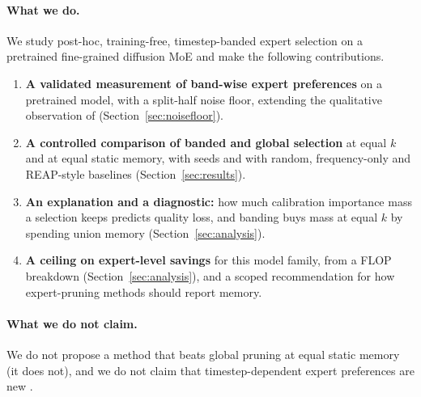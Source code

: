 \paragraph{What we do.}
We study post-hoc, training-free, timestep-banded expert selection on a pretrained fine-grained diffusion MoE and make the following contributions.
\begin{enumerate}
\item \textbf{A validated measurement of band-wise expert preferences} on a pretrained model, with a split-half noise floor, extending the qualitative observation of \citet{fei2024ditmoe} (Section~\ref{sec:noisefloor}). 
\item \textbf{A controlled comparison of banded and global selection} at equal $k$ and at equal static memory, with seeds and with random, frequency-only and REAP-style baselines (Section~\ref{sec:results}). 
\item \textbf{An explanation and a diagnostic:} how much calibration importance mass a selection keeps predicts quality loss, and banding buys mass at equal $k$ by spending union memory (Section~\ref{sec:analysis}). 
\item \textbf{A ceiling on expert-level savings} for this model family, from a FLOP breakdown (Section~\ref{sec:analysis}), and a scoped recommendation for how expert-pruning methods should report memory.
\end{enumerate}

\paragraph{What we do not claim.}
We do not propose a method that beats global pruning at equal static memory (it does not), and we do not claim that timestep-dependent expert preferences are new \citep{fei2024ditmoe}.

